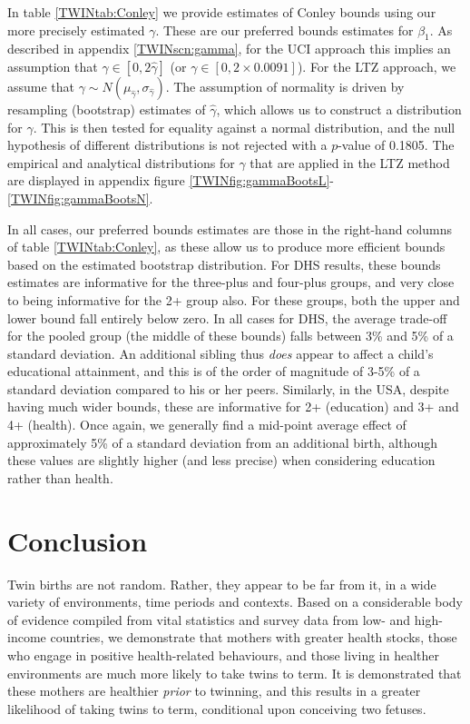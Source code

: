 \documentclass[subeqn]{article}
\begin{document}
\begin{spacing}{1.4}
In table \ref{TWINtab:Conley} we provide estimates of Conley bounds using 
our more precisely estimated $\gamma$.  These are our preferred bounds 
estimates for $\beta_1$.  As described in appendix \ref{TWINscn:gamma}, for 
the UCI approach this implies an assumption that $\gamma \in [0,2\hat\gamma]$
(or $\gamma \in [0,2\times 0.0091]$).  For the LTZ approach, we assume that 
$\gamma\sim N(\mu_{\hat\gamma},\sigma_{\hat\gamma})$.  The assumption of 
normality is driven by resampling (bootstrap) estimates of $\hat\gamma$,
which allows us to construct a distribution for $\gamma$.  This is then
tested for equality against a normal distribution, and the null hypothesis
of different distributions is not rejected with a $p$-value of 0.1805.  The 
empirical and analytical distributions for $\gamma$ that are applied in the 
LTZ method are displayed in appendix figure \ref{TWINfig:gammaBootsL}-%
\ref{TWINfig:gammaBootsN}.

In all cases, our preferred bounds estimates are those in the right-hand
columns of table \ref{TWINtab:Conley}, as these allow us to produce more
efficient bounds based on the estimated bootstrap distribution.  For DHS
results, these bounds estimates are informative for the three-plus and 
four-plus groups, and very close to being informative for the 2+ group also.  
For these groups, both the upper and lower bound fall entirely below zero. In
all cases for DHS, the average trade-off for the pooled group (the middle of
these bounds) falls between 3\% and 5\% of a standard deviation.  An additional
sibling thus \emph{does} appear to affect a child's educational attainment,
and this is of the order of magnitude of 3-5\% of a standard deviation compared
to his or her peers.  Similarly, in the USA, despite having much wider bounds,
these are informative for 2+ (education) and 3+ and 4+ (health).  Once again,
we generally find a mid-point average effect of approximately 5\% of a 
standard deviation from an additional birth, although these values are slightly
higher (and less precise) when considering education rather than health.
 


\section{Conclusion}                               \label{TWINscn:conclusion}
Twin births are not random.  Rather, they appear to be far from it, in a wide
variety of environments, time periods and contexts.  Based on a considerable 
body of evidence compiled from vital statistics and survey data from low- and 
high-income countries, we demonstrate that mothers with greater health stocks,
those who engage in positive health-related behaviours, and those living in 
healther environments are much more likely to take twins to term.  It is 
demonstrated that these mothers are healthier \emph{prior} to twinning, and
this results in a greater likelihood of taking twins to term, conditional upon
conceiving two fetuses.


\end{spacing}
\end{document}
